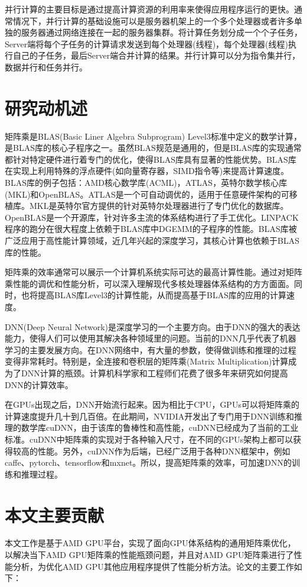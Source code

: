 并行计算的主要目标是通过提高计算资源的利用率来使得应用程序运行的更快。通常情况下，并行计算的基础设施可以是服务器机架上的一个多个处理器或者许多单独的服务器通过网络连接在一起的服务器集群。将计算任务划分成一个个子任务，Server端将每个子任务的计算请求发送到每个处理器(线程)，每个处理器(线程)执行自己的子任务，最后Server端合并计算的结果。并行计算可以分为指令集并行，数据并行和任务并行。


\section{研究动机述}
矩阵乘是BLAS(Basic Liner Algebra Subprogram) Level3标准中定义的数学计算，是BLAS库的核心子程序之一。虽然BLAS规范是通用的，但是BLAS库的实现通常都针对特定硬件进行着专门的优化，使得BLAS库具有显著的性能优势。BLAS库在实现上利用特殊的浮点硬件(如向量寄存器，SIMD指令等)来提高计算速度。BLAS库的例子包括：AMD核心数学库(ACML)，ATLAS，英特尔数学核心库(MKL)和OpenBLAS。ATLAS是一个可自动调优的，适用于任意硬件架构的可移植库。MKL是英特尔官方提供的针对英特尔处理器进行了专门优化的数据库。OpenBLAS是一个开源库，针对许多主流的体系结构进行了手工优化。LINPACK程序的跑分在很大程度上依赖于BLAS库中DGEMM的子程序的性能。BLAS库被广泛应用于高性能计算领域，近几年兴起的深度学习，其核心计算也依赖于BLAS库的性能。

矩阵乘的效率通常可以展示一个计算机系统实际可达的最高计算性能。通过对矩阵乘性能的调优和性能分析，可以深入理解现代多核处理器体系结构的方方面面。同时，也将提高BLAS库Level3的计算性能，从而提高基于BLAS库的应用的计算速度。

DNN(Deep Neural Network)是深度学习的一个主要方向。由于DNN的强大的表达能力，使得人们可以使用其解决各种领域里的问题。当前的DNN几乎代表了机器学习的主要发展方向。在DNN网络中，有大量的参数，使得做训练和推理的过程变得非常耗时。特别是，全连接和卷积层的矩阵乘(Matrix Multiplication)计算成为了DNN计算的瓶颈。计算机科学家和工程师们花费了很多年来研究如何提高DNN的计算效率。

在GPUs出现之后，DNN开始流行起来。因为相比于CPU，GPUs可以将矩阵乘的计算速度提升几十到几百倍。在此期间，NVIDIA开发出了专门用于DNN训练和推理的数学库cuDNN，由于该库的鲁棒性和高性能，cuDNN已经成为了当前的工业标准。cuDNN中矩阵乘的实现对于各种输入尺寸，在不同的GPUs架构上都可以获得较高的性能。另外，cuDNN作为后端，已经广泛用于各种DNN框架中，例如caffe、pytorch、tensorflow和mxnet。所以，提高矩阵乘的效率，可加速DNN的训练和推理过程。


\section{本文主要贡献}
本文工作是基于AMD GPU平台，实现了面向GPU体系结构的通用矩阵乘优化，以解决当下AMD GPU矩阵乘的性能瓶颈问题，并且对AMD GPU矩阵乘进行了性能分析，为优化AMD GPU其他应用程序提供了性能分析方法。论文的主要工作如下：

